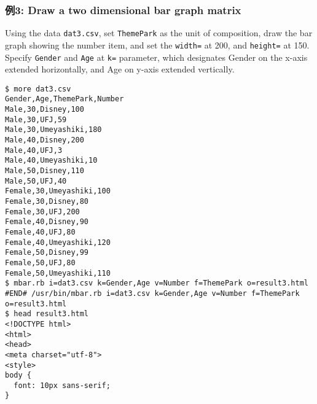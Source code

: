 \begin{flushleft}
\end{flushleft}


\subsubsection*{例3: Draw a two dimensional bar graph matrix}

Using the data \verb|dat3.csv|, set \verb|ThemePark| as the unit of composition, draw the bar graph showing the number item, and set the \verb|width=| at 200, and \verb|height=| at 150. Specify \verb|Gender| and \verb|Age| at \verb|k=| parameter, which designates Gender on the x-axis extended horizontally, and Age on y-axis extended vertically.


\begin{Verbatim}[baselinestretch=0.7,frame=single]
$ more dat3.csv
Gender,Age,ThemePark,Number
Male,30,Disney,100
Male,30,UFJ,59
Male,30,Umeyashiki,180
Male,40,Disney,200
Male,40,UFJ,3
Male,40,Umeyashiki,10
Male,50,Disney,110
Male,50,UFJ,40
Female,30,Umeyashiki,100
Female,30,Disney,80
Female,30,UFJ,200
Female,40,Disney,90
Female,40,UFJ,80
Female,40,Umeyashiki,120
Female,50,Disney,99
Female,50,UFJ,80
Female,50,Umeyashiki,110
$ mbar.rb i=dat3.csv k=Gender,Age v=Number f=ThemePark o=result3.html
#END# /usr/bin/mbar.rb i=dat3.csv k=Gender,Age v=Number f=ThemePark o=result3.html
$ head result3.html
<!DOCTYPE html>
<html>
<head>
<meta charset="utf-8">
<style>
body {
  font: 10px sans-serif;
}
\end{Verbatim}

\begin{flushleft}
\end{flushleft}


